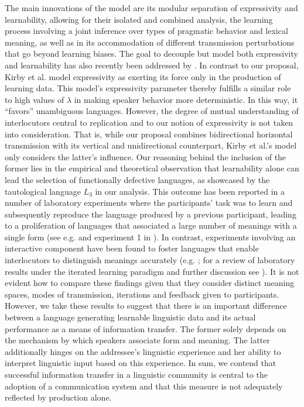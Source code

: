 \documentclass[a4paper]{article}
\begin{document}
The main innovations of the model are its modular separation of expressivity and learnability, allowing for their isolated and combined analysis, the learning process involving a joint inference over types of pragmatic behavior and lexical meaning, as well as in its accommodation of different transmission perturbations that go beyond learning biases. The goal to decouple but model both expressivity and learnability has also recently been addressed by \citet{kirby+etal:2015}. In contrast to our proposal, Kirby et al. model expressivity as exerting its force only in the production of learning data. This model's expressivity parameter thereby fulfills a similar role  to high values of $\lambda$ in making speaker behavior more deterministic. In this way, it ``favors'' unambiguous languages. However, the degree of mutual understanding of interlocutors central to replication and to our notion of expressivity is not taken into consideration. That is, while our proposal combines bidirectional horizontal transmission with its vertical and unidirectional counterpart, Kirby et al.'s model only considers the latter's influence. Our reasoning behind the inclusion of the former lies in the empirical and theoretical observation that learnability alone can lead the selection of functionally defective languages, as showcased by the tautological language $L_3$ in our analysis. This outcome has been reported in a number of laboratory experiments where the participants' task was to learn and subsequently reproduce the language produced by a previous participant, leading to a proliferation of languages that associated a large number of meanings with a single form (see e.g. \citealt{silvey+etal:2014} and experiment 1 in \citealt{kirby+etal:2008}). In contrast, experiments involving an interactive component have been found to foster languages that enable interlocutors to distinguish meanings accurately  (e.g. \citealt{fay+etal:2013}; for a review of laboratory results under the iterated learning paradigm and further discussion see \citealt{kirby+etal:2015, tamariz+kirby:2016}). It is not evident how to compare these findings given that they consider distinct meaning spaces, modes of transmission, iterations and feedback given to participants. However, we take these results to suggest that there is an important difference between a language generating learnable linguistic data and its actual performance as a means of information transfer. The former solely depends on the mechanism by which speakers associate form and meaning. The latter additionally hinges on the addressee's linguistic experience and her ability to interpret linguistic input based on this experience. In sum, we contend that successful information transfer in a linguistic community is central to the adoption of a communication system and that this measure is not adequately reflected by production alone.
\end{document}
